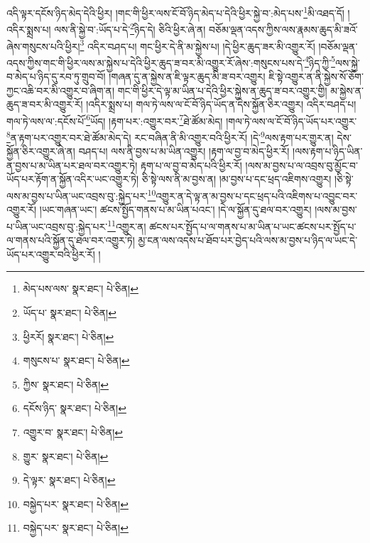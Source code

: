 འདི་ལྟར་དངོས་ཉིད་མེད་དེའི་ཕྱིར། །གང་གི་ཕྱིར་ལས་ངོ་བོ་ཉིད་མེད་པ་དེའི་ཕྱིར་སྐྱེ་བ་:མེད་པས་\footnote{མེད་པས་ལས་  སྣར་ཐང་།  པེ་ཅིན། }མི་འཐད་དོ། །འདིར་སྨྲས་པ། ལས་ནི་སྐྱེ་བ་:ཡོད་པ་དེ་\footnote{ཡོད་པ་  སྣར་ཐང་།  པེ་ཅིན། }ཉིད་དེ། ཅིའི་ཕྱིར་ཞེ་ན། བཅོམ་ལྡན་འདས་ཀྱིས་ལས་རྣམས་ཆུད་མི་ཟའོ་ཞེས་གསུངས་པའི་ཕྱིར།\footnote{ཕྱིརརོ།  སྣར་ཐང་།  པེ་ཅིན། } འདིར་བཤད་པ། གང་ཕྱིར་དེ་ནི་མ་སྐྱེས་པ། །དེ་ཕྱིར་ཆུད་ཟར་མི་འགྱུར་རོ། །བཅོམ་ལྡན་འདས་ཀྱིས་གང་གི་ཕྱིར་ལས་མ་སྐྱེས་པ་དེའི་ཕྱིར་ཆུད་ཟ་བར་མི་འགྱུར་རོ་ཞེས་:གསུངས་པས་དེ་\footnote{གསུངས་པ་  སྣར་ཐང་།  པེ་ཅིན། }ཉིད་ཀྱི་\footnote{ཀྱིས་  སྣར་ཐང་།  པེ་ཅིན། }ལས་སྐྱེ་བ་མེད་པ་ཉིད་དུ་རབ་ཏུ་གྲུབ་བོ། །གཞན་དུ་ན་སྐྱེས་ན་ཇི་ལྟར་ཆུད་མི་ཟ་བར་འགྱུར། ཇི་སྟེ་འགྱུར་ན་ནི་སྐྱེས་སོ་ཅོག་ཀྱང་འཆི་བར་མི་འགྱུར་བ་ཞིག་ན། གང་གི་ཕྱིར་དེ་ལྟ་མ་ཡིན་པ་དེའི་ཕྱིར་སྐྱེས་ན་ཆུད་ཟ་བར་འགྱུར་གྱི། མ་སྐྱེས་ན་ཆུད་ཟ་བར་མི་འགྱུར་རོ། །འདིར་སྨྲས་པ། གལ་ཏེ་ལས་ལ་ངོ་བོ་ཉིད་ཡོད་ན་དེས་སྐྱོན་ཅིར་འགྱུར། འདིར་བཤད་པ། གལ་ཏེ་ལས་ལ་:དངོས་པོ་\footnote{དངོས་ཉིད་  སྣར་ཐང་།  པེ་ཅིན། }ཡོད། །རྟག་པར་:འགྱུར་བར་\footnote{འགྱུར་བ་  སྣར་ཐང་།  པེ་ཅིན། }ཐེ་ཚོམ་མེད། །གལ་ཏེ་ལས་ལ་ངོ་བོ་ཉིད་ཡོད་པར་འགྱུར་\footnote{གྱུར་  སྣར་ཐང་།  པེ་ཅིན། }ན་རྟག་པར་འགྱུར་བར་ཐེ་ཚོམ་མེད་དེ། རང་བཞིན་ནི་མི་འགྱུར་བའི་ཕྱིར་རོ། །དེ་\footnote{དེ་ལྟར་  སྣར་ཐང་།  པེ་ཅིན། }ལས་རྟག་པར་གྱུར་ན། དེས་སྐྱོན་ཅིར་འགྱུར་ཞེ་ན། བཤད་པ། ལས་ནི་བྱས་པ་མ་ཡིན་འགྱུར། །རྟག་ལ་བྱ་བ་མེད་ཕྱིར་རོ། །ལས་རྟག་པ་ཉིད་ཡིན་ན་བྱས་པ་མ་ཡིན་པར་ཐལ་བར་འགྱུར་ཏེ། རྟག་པ་ལ་བྱ་བ་མེད་པའི་ཕྱིར་རོ། །ལས་མ་བྱས་པ་ལ་འབྲས་བུ་མྱོང་བ་ཡོད་པར་རྟོག་ན་སྐྱོན་འདིར་ཡང་འགྱུར་ཏེ། ཅི་སྟེ་ལས་ནི་མ་བྱས་ན། །མ་བྱས་པ་དང་ཕྲད་འཇིགས་འགྱུར། །ཅི་སྟེ་ལས་མ་བྱས་པ་ཡིན་ཡང་འབྲས་བུ་:སྐྱེད་པར་\footnote{བསྐྱེད་པར་  སྣར་ཐང་།  པེ་ཅིན། }འགྱུར་ན་དེ་ལྟ་ན་མ་བྱས་པ་དང་ཕྲད་པའི་འཇིགས་པ་འབྱུང་བར་འགྱུར་རོ། །ཡང་གཞན་ཡང་། ཚངས་སྤྱོད་གནས་པ་མ་ཡིན་པའང་། །དེ་ལ་སྐྱོན་དུ་ཐལ་བར་འགྱུར། །ལས་མ་བྱས་པ་ཡིན་ཡང་འབྲས་བུ་:སྐྱེད་པར་\footnote{བསྐྱེད་པར་  སྣར་ཐང་།  པེ་ཅིན། }འགྱུར་ན། ཚངས་པར་སྤྱོད་པ་ལ་གནས་པ་མ་ཡིན་པ་ཡང་ཚངས་པར་སྤྱོད་པ་ལ་གནས་པའི་སྐྱོན་དུ་ཐལ་བར་འགྱུར་ཏེ། མྱ་ངན་ལས་འདས་པ་ཐོབ་པར་བྱེད་པའི་ལས་མ་བྱས་པ་ཉིད་ལ་ཡང་དེ་ཡོད་པར་འགྱུར་བའི་ཕྱིར་རོ། །
